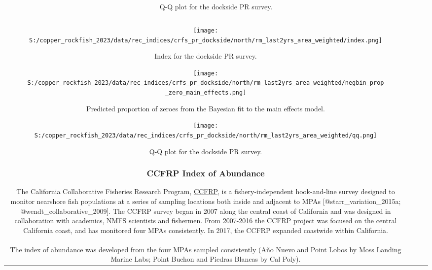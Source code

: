 \documentclass[11pt,
  letterpaper,
]{article}
\begin{document}
\begin{longtable}[t]{c>{\centering\arraybackslash}p{2cm}>{\centering\arraybackslash}p{2cm}>{\centering\arraybackslash}p{2cm}}
\begin{figure}
{\centering
\texttt{[image: S:/copper\_rockfish\_2023/data/rec\_indices/crfs\_pr\_dockside/north/rm\_last2yrs\_area\_weighted/index.png]}
}
\caption{Index for the dockside PR survey.\label{fig:pr-index}}
\end{figure}

\begin{figure}
{\centering
\texttt{[image: S:/copper\_rockfish\_2023/data/rec\_indices/crfs\_pr\_dockside/north/rm\_last2yrs\_area\_weighted/negbin\_prop\_zero\_main\_effects.png]}
}
\caption{Predicted proportion of zeroes from the Bayesian fit to the main effects model.\label{fig:pr-prop-zero}}
\end{figure}

\begin{figure}
{\centering
\texttt{[image: S:/copper\_rockfish\_2023/data/rec\_indices/crfs\_pr\_dockside/north/rm\_last2yrs\_area\_weighted/qq.png]}
}
\caption{Q-Q plot for the dockside PR survey.\label{fig:pr-qq}}
\end{figure}

\subsubsection{CCFRP Index of Abundance}\label{ccfrp-index}

The California Collaborative Fisheries Research Program, \href{https://www.mlml.calstate.edu/ccfrp/}{CCFRP}, is a fishery-independent hook-and-line survey designed to monitor nearshore fish populations at a series of sampling locations both inside and adjacent to MPAs {[}@starr\_variation\_2015a; @wendt\_collaborative\_2009{]}. The CCFRP survey began in 2007 along the central coast of California and was designed in collaboration with academics, NMFS scientists and fishermen. From 2007-2016 the CCFRP project was focused on the central California coast, and has monitored four MPAs consistently. In 2017, the CCFRP expanded coastwide within California.\\
The index of abundance was developed from the four MPAs sampled consistently (Año Nuevo and Point Lobos by Moss Landing Marine Labs; Point Buchon and Piedras Blancas by Cal Poly).


\end{longtable}
\end{document}
